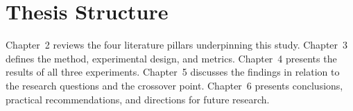 \section{Thesis Structure}

Chapter~2 reviews the four literature pillars underpinning this study. Chapter~3 defines
the method, experimental design, and metrics. Chapter~4 presents the results of all three
experiments. Chapter~5 discusses the findings in relation to the research questions and the
crossover point. Chapter~6 presents conclusions, practical recommendations, and directions
for future research.
